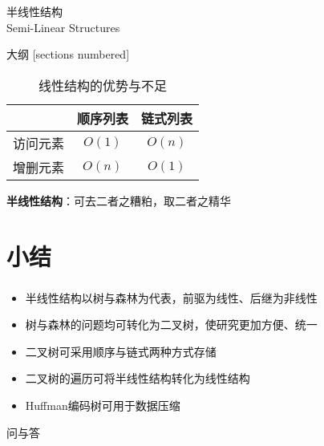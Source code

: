\begin{standout}[第二章]
    半线性结构\\
    Semi-Linear Structures
\end{standout}

\begin{frame}{大纲}
    [sections numbered]
    \tableofcontents
\end{frame}

\begin{frame}
    \begin{table}
        \small
        \label{tab:linear_structures_disadvantages}
        \caption{线性结构的优势与不足}
        \begin{tabular}{rcc}
            \toprule
            & \textbf{顺序列表} & \textbf{链式列表} \\
            \midrule
            访问元素 & $O(1)$ & $O(n)$ \\
            增删元素 & $O(n)$ & $O(1)$ \\
            \bottomrule
        \end{tabular}
    \end{table}
    \pause
    \centering
    \textbf{半线性结构}：可去二者之糟粕，取二者之精华
\end{frame}





\section{小结}

\begin{frame}
    \frametitle{\insertsectionhead}
    \begin{itemize}
        \item 半线性结构以树与森林为代表，前驱为线性、后继为非线性
        \item 树与森林的问题均可转化为二叉树，使研究更加方便、统一
        \item 二叉树可采用顺序与链式两种方式存储
        \item 二叉树的遍历可将半线性结构转化为线性结构
        \item Huffman编码树可用于数据压缩
    \end{itemize}
\end{frame}

\begin{standout}[]
    问与答
\end{standout}